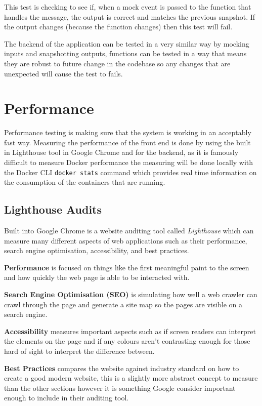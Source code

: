 This test is checking to see if, when a mock event is passed to the function that handles the message, the output is correct and matches the previous snapshot. If the output changes (because the function changes) then this test will fail.

The backend of the application can be tested in a very similar way by mocking inputs and snapshotting outputs, functions can be tested in a way that means they are robust to future change in the codebase so any changes that are unexpected will cause the test to fails.

\section{Performance}

Performance testing is making sure that the system is working in an acceptably fast way. Measuring the performance of the front end is done by using the built in Lighthouse tool in Google Chrome and for the backend, as it is famously difficult to measure Docker performance \cite{docker-perf} the measuring will be done locally with the Docker CLI \texttt{docker stats} command which provides real time information on the consumption of the containers that are running.

\subsection{Lighthouse Audits}

Built into Google Chrome is a website auditing tool called \textit{Lighthouse} \cite{google-lighthouse} which can measure many different aspects of web applications such as their performance, search engine optimisation, accessibility, and best practices. 

\textbf{Performance} is focused on things like the first meaningful paint to the screen and how quickly the web page is able to be interacted with. 

\textbf{Search Engine Optimisation (SEO)} is simulating how well a web crawler can crawl through the page and generate a site map so the pages are visible on a search engine. 

\textbf{Accessibility} measures important aspects such as if screen readers can interpret the elements on the page and if any colours aren't contrasting enough for those hard of sight to interpret the difference between.

\textbf{Best Practices} compares the website against industry standard on how to create a good modern website, this is a slightly more abstract concept to measure than the other sections however it is something Google consider important enough to include in their auditing tool. 

